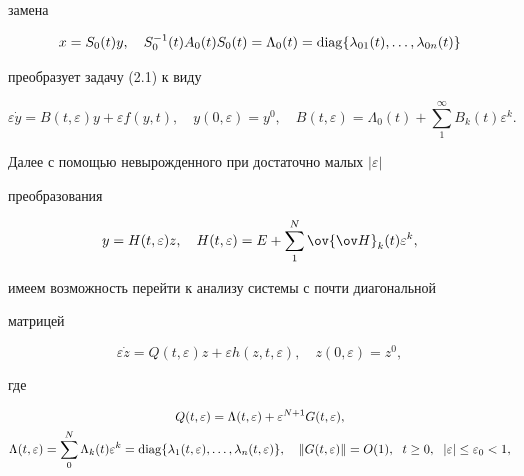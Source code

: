 замена  


$$ 


x=S_0(t)y,\quad S^{-1}_0(t)A_0(t)S_0(t)=\Lambda_0(t)= 


\diag\{\lambda_{01}(t),\dotsc,\lambda_{0n}(t)\} 


$$ 


преобразует задачу (2.1) к виду 


$$ 


\varepsilon\Dot y=B(t,\varepsilon)y+\varepsilon f(y,t),\quad 


y(0,\varepsilon)=y^0,\quad B(t,\varepsilon)=\Lambda_0(t)+ 


\sum^\infty_1B_k(t)\varepsilon^k. 


$$ 





Далее с помощью невырожденного при достаточно малых $|\varepsilon|$ 


преобразования 


$$ 


y=H(t,\varepsilon)z,\quad H(t,\varepsilon)=E+\sum^N_1\ov{\ov H}_k(t) 


\varepsilon^k, 


$$ 


имеем возможность перейти к анализу системы с почти диагональной 


матрицей 


\begin{equation} 


\varepsilon\Dot z=Q(t,\varepsilon)z+\varepsilon h(z,t,\varepsilon), 


\quad z(0,\varepsilon)=z^0, 


\end{equation} 


где 


\begin{gather*} 


Q(t,\varepsilon)=\Lambda(t,\varepsilon)+\varepsilon^{N+1} 


G(t,\varepsilon),\\ 


\Lambda(t,\varepsilon)=\sum^N_0\Lambda_k(t)\varepsilon^k= 


\diag\{\lambda_1(t,\varepsilon),\dotsc,\lambda_n(t,\varepsilon)\}, 


\quad \|G(t,\varepsilon)\|=O(1),\ \; t\ge0, 


\ \; |\varepsilon|\le\varepsilon_0<1, 


\end{gather*} 


